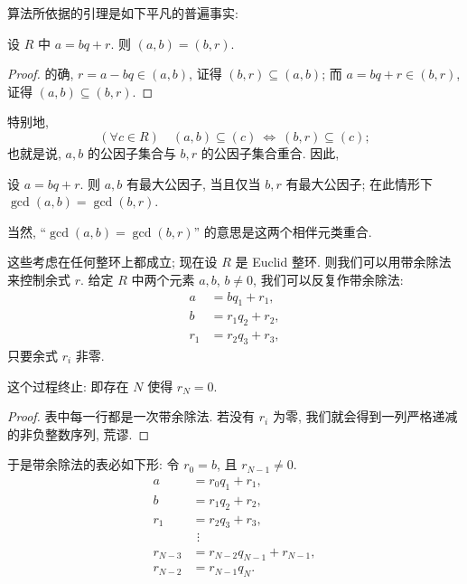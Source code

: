 \noindent 算法所依据的引理是如下平凡的普遍事实:

\begin{lemma}\label{lem:gcd-remainder}
设 $R$ 中 $a=bq+r$. 则 $(a,b)=(b,r)$.
\end{lemma}

\begin{proof}
的确, $r=a-bq\in (a,b)$, 证得 $(b,r)\subseteq (a,b)$; 而 $a=bq+r\in (b,r)$, 证得 $(a,b)\subseteq (b,r)$.
\end{proof}

\noindent 特别地,
\[
(\forall c\in R)\quad (a,b)\subseteq (c)\ \Longleftrightarrow\ (b,r)\subseteq (c);
\]
也就是说, $a,b$ 的公因子集合与 $b,r$ 的公因子集合重合. 因此,

\begin{corollary}\label{cor:gcd-remainder}
设 $a=bq+r$. 则 $a,b$ 有最大公因子, 当且仅当 $b,r$ 有最大公因子; 在此情形下 $\gcd(a,b)=\gcd(b,r)$.
\end{corollary}

\noindent 当然, ``$\gcd(a,b)=\gcd(b,r)$'' 的意思是这两个相伴元类重合.

\noindent 这些考虑在任何整环上都成立; 现在设 $R$ 是 Euclid 整环. 则我们可以用带余除法来控制余式 $r$. 给定 $R$ 中两个元素 $a,b$, $b\neq 0$, 我们可以反复作带余除法:
\[
\begin{aligned}
a &= bq_1 + r_1,\\
b &= r_1q_2 + r_2,\\
r_1 &= r_2q_3 + r_3,
\end{aligned}
\]
只要余式 $r_i$ 非零.

\begin{claim}\label{claim:euclid-terminates}
这个过程终止: 即存在 $N$ 使得 $r_N=0$.
\end{claim}

\begin{proof}
表中每一行都是一次带余除法. 若没有 $r_i$ 为零, 我们就会得到一列严格递减的非负整数序列, 荒谬.
\end{proof}

\noindent 于是带余除法的表必如下形: 令 $r_0=b$, 且 $r_{N-1}\neq 0$.
\[
\begin{aligned}
a &= r_0q_1 + r_1,\\
b &= r_1q_2 + r_2,\\
r_1 &= r_2q_3 + r_3,\\
&\ \,\vdots\\
r_{N-3} &= r_{N-2}q_{N-1} + r_{N-1},\\
r_{N-2} &= r_{N-1}q_N.
\end{aligned}
\]

